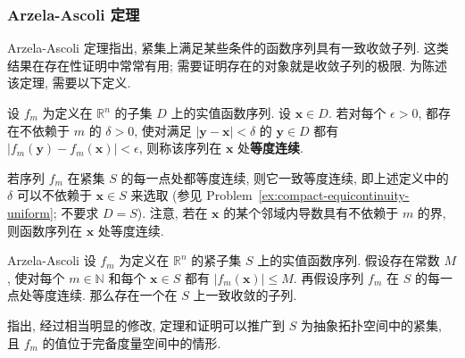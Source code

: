 \subsubsection{Arzela-Ascoli 定理}\label{subsec:arzela-ascoli-theorem}

Arzela-Ascoli 定理指出, 紧集上满足某些条件的函数序列具有一致收敛子列. 这类结果在存在性证明中常常有用; 需要证明存在的对象就是收敛子列的极限. 为陈述该定理, 需要以下定义.

\begin{Definition}
\label{def:equicontinuity}
设 $f_m$ 为定义在 $\mathbb{R}^n$ 的子集 $D$ 上的实值函数序列. 设 $\bm{x}\in D$. 若对每个 $\epsilon>0$, 都存在不依赖于 $m$ 的 $\delta>0$, 使对满足 $|\bm{y}-\bm{x}|<\delta$ 的 $\bm{y}\in D$ 都有 $|f_m(\bm{y})-f_m(\bm{x})|<\epsilon$, 则称该序列在 $\bm{x}$ 处\textbf{等度连续}.
\end{Definition}

若序列 $f_m$ 在紧集 $S$ 的每一点处都等度连续, 则它一致等度连续, 即上述定义中的 $\delta$ 可以不依赖于 $\bm{x}\in S$ 来选取 (参见 Problem~\ref{ex:compact-equicontinuity-uniform}; 不要求 $D=S$). 注意, 若在 $\bm{x}$ 的某个邻域内导数具有不依赖于 $m$ 的界, 则函数序列在 $\bm{x}$ 处等度连续.

\begin{Theorem}{Arzela-Ascoli}
\label{thm:arzela-ascoli}
设 $f_m$ 为定义在 $\mathbb{R}^n$ 的紧子集 $S$ 上的实值函数序列. 假设存在常数 $M$, 使对每个 $m\in\mathbb{N}$ 和每个 $\bm{x}\in S$ 都有 $|f_m(\bm{x})|\leq M$. 再假设序列 $f_m$ 在 $S$ 的每一点处等度连续. 那么存在一个在 $S$ 上一致收敛的子列.
\end{Theorem}

指出, 经过相当明显的修改, 定理和证明可以推广到 $S$ 为抽象拓扑空间中的紧集, 且 $f_m$ 的值位于完备度量空间中的情形.

